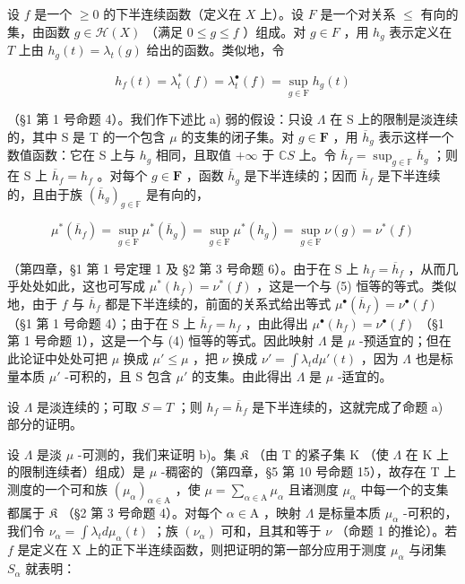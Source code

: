 设 \(f\) 是一个 \(\geqslant 0\) 的下半连续函数（定义在 \(X\) 上）。设 \(F\) 是一个对关系 \(\leqslant\) 有向的集，由函数 \(g \in \mathcal{H}(X)\) （满足 \(0 \leqslant g \leqslant f\) ）组成。对 \(g \in F\) ，用 \(h_g\) 表示定义在 \(T\) 上由 \(h_g(t) = \lambda_t(g)\) 给出的函数。类似地，令

\[
h _ {f} (t) = \lambda_ {t} ^ {*} (f) = \lambda_ {t} ^ {\bullet} (f) = \sup _ {g \in \mathrm{F}} h _ {g} (t)
\]

（§1 第 1 号命题 4）。我们作下述比 a) 弱的假设：只设 \(\Lambda\) 在 S 上的限制是淡连续的，其中 S 是 T 的一个包含 \(\mu\) 的支集的闭子集。对 \(g \in \mathbf{F}\) ，用 \(\overline{h}_g\) 表示这样一个数值函数：它在 S 上与 \(h_g\) 相同，且取值 \(+\infty\) 于 \(\mathbb{C}S\) 上。令 \(\overline{h}_f = \sup_{g \in \mathbb{F}} \overline{h}_g\) ；则在 S 上 \(\overline{h}_f = h_f\) 。对每个 \(g \in \mathbf{F}\) ，函数 \(\overline{h}_g\) 是下半连续的；因而 \(\overline{h}_f\) 是下半连续的，且由于族 \((\overline{h}_g)_{g \in \mathbb{F}}\) 是有向的，

\[
\mu^ {*} (\overline {{h}} _ {f}) = \sup _ {g \in \mathrm{F}} \mu^ {*} (\overline {{h}} _ {g}) = \sup _ {g \in \mathrm{F}} \mu^ {*} (h _ {g}) = \sup _ {g \in \mathrm{F}} \nu (g) = \nu^ {*} (f)
\]

（第四章，§1 第 1 号定理 1 及 §2 第 3 号命题 6）。由于在 S 上 \(h_f = \overline{h}_f\) ，从而几乎处处如此，这也可写成 \(\mu^*(h_f) = \nu^*(f)\) ，这是一个与 (5) 恒等的等式。类似地，由于 \(f\) 与 \(\overline{h}_f\) 都是下半连续的，前面的关系式给出等式 \(\mu^\bullet(\overline{h}_f) = \nu^\bullet(f)\) （§1 第 1 号命题 4）；由于在 S 上 \(\overline{h}_f = h_f\) ，由此得出 \(\mu^\bullet(h_f) = \nu^\bullet(f)\) （§1 第 1 号命题 1），这是一个与 (4) 恒等的等式。因此映射 \(\Lambda\) 是 \(\mu\) -预适宜的；但在此论证中处处可把 \(\mu\) 换成 \(\mu' \leqslant \mu\) ，把 \(\nu\) 换成 \(\nu' = \int \lambda_t d\mu'(t)\) ，因为 \(\Lambda\) 也是标量本质 \(\mu'\) -可积的，且 S 包含 \(\mu'\) 的支集。由此得出 \(\Lambda\) 是 \(\mu\) -适宜的。

设 \(\Lambda\) 是淡连续的；可取 \(S = T\) ；则 \(h_f = \overline{h}_f\) 是下半连续的，这就完成了命题 a) 部分的证明。

设 \(\Lambda\) 是淡 \(\mu\) -可测的，我们来证明 b)。集 \(\mathfrak{K}\) （由 T 的紧子集 K （使 \(\Lambda\) 在 K 上的限制连续者）组成）是 \(\mu\) -稠密的（第四章，§5 第 10 号命题 15），故存在 T 上测度的一个可和族 \((\mu_{\alpha})_{\alpha \in \mathrm{A}}\) ，使 \(\mu = \sum_{\alpha \in \mathrm{A}} \mu_{\alpha}\) 且诸测度 \(\mu_{\alpha}\) 中每一个的支集都属于 \(\mathfrak{K}\) （§2 第 3 号命题 4）。对每个 \(\alpha \in \mathrm{A}\) ，映射 \(\Lambda\) 是标量本质 \(\mu_{\alpha}\) -可积的，我们令 \(\nu_{\alpha} = \int \lambda_t d\mu_{\alpha}(t)\) ；族 \((\nu_{\alpha})\) 可和，且其和等于 \(\nu\) （命题 1 的推论）。若 \(f\) 是定义在 X 上的正下半连续函数，则把证明的第一部分应用于测度 \(\mu_{\alpha}\) 与闭集 \(S_{\alpha}\) 就表明：

